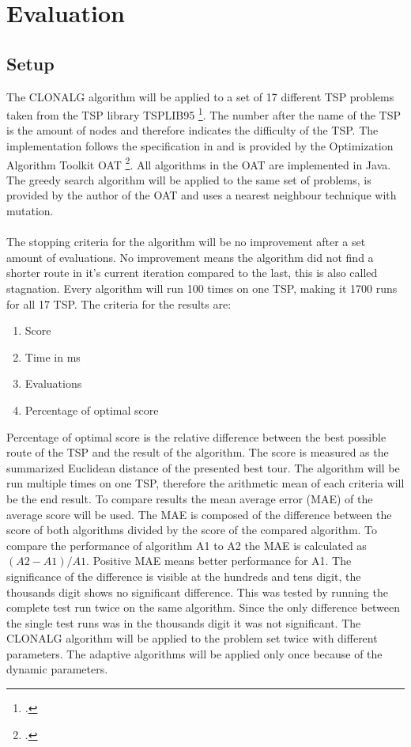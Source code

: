 \chapter{Evaluation}
\label{chap:eva}
\section{Setup}
The CLONALG algorithm will be applied to a set of 17 different TSP problems taken from the TSP library TSPLIB95 \footcite[https://www.iwr.uni-heidelberg.de/groups/comopt/software/TSPLIB95/]{tsplib}. The number after the name of the TSP is the amount of nodes and therefore indicates the difficulty of the TSP. The implementation follows the specification in \cite{DEC02} and is provided by the Optimization Algorithm Toolkit OAT \footcite[http://optalgtoolkit.sourceforge.net/]{oat}. All algorithms in the OAT are implemented in Java. The greedy search algorithm will be applied to the same set of problems, is provided by the author of the OAT and uses a nearest neighbour technique with mutation.\\\\ 
The stopping criteria for the algorithm will be no improvement after a set amount of evaluations. No improvement means the algorithm did not find a shorter route in it's current iteration compared to the last, this is also called stagnation. Every algorithm will run 100 times on one TSP, making it 1700 runs for all 17 TSP.
The criteria for the results are:
\begin{enumerate}
	\item 	Score
	\item 	Time in ms
	\item 	Evaluations	
	\item  	Percentage of optimal score
\end{enumerate}
Percentage of optimal score is the relative difference between the best possible route of the TSP and the result of the algorithm. The score is measured as the summarized Euclidean distance of the presented best tour. The algorithm will be run multiple times on one TSP, therefore the arithmetic mean of each criteria will be the end result. To compare results the mean average error (MAE) of the average score will be used. The MAE is composed of the difference between the score of both algorithms divided by the score of the compared algorithm. To compare the performance of algorithm A1 to A2 the MAE is calculated as $(A2-A1)/A1$. Positive MAE means better performance for A1. The significance of the difference is visible at the hundreds and tens digit, the thousands digit shows no significant difference. This was tested by running the complete test run twice on the same algorithm. Since the only difference between the single test runs was in the thousands digit it was not significant. The CLONALG algorithm will be applied to the problem set twice with different parameters. The adaptive algorithms will be applied only once because of the dynamic parameters.
